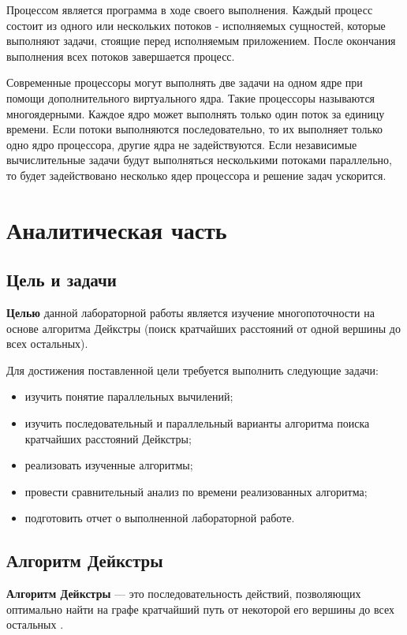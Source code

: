 \documentclass[a4paper,14pt, unknownkeysallowed]{extreport}
\begin{document}
Процессом является программа в ходе своего выполнения. 
Каждый процесс состоит из одного или нескольких потоков - исполняемых сущностей, которые выполняют задачи, стоящие перед исполняемым приложением. 
После окончания выполнения всех потоков завершается процесс.

Современные процессоры могут выполнять две задачи на одном ядре при помощи дополнительного виртуального ядра. 
Такие процессоры называются многоядерными. 
Каждое ядро может выполнять только один поток за единицу времени. 
Если потоки выполняются последовательно, то их выполняет только одно ядро процессора, другие ядра не задействуются. 
Если независимые вычислительные задачи будут выполняться несколькими потоками параллельно, то будет задействовано несколько ядер процессора и решение задач ускорится.

	
\chapter{Аналитическая часть}
	
\section{Цель и задачи}
\textbf{Целью} данной лабораторной работы является изучение многопоточности на основе алгоритма Дейкстры (поиск кратчайших расстояний от одной вершины до всех остальных). 

Для достижения поставленной цели требуется выполнить следующие задачи:

\begin{itemize}
	\item изучить понятие параллельных вычилений;
	\item изучить последовательный и параллельный варианты алгоритма поиска кратчайших расстояний Дейкстры;
	\item реализовать изученные алгоритмы;
	\item провести сравнительный анализ по времени реализованных алгоритма;
	\item подготовить отчет о выполненной лабораторной работе.
\end{itemize}
	
	
\section{Алгоритм Дейкстры}

\textbf{Алгоритм Дейкстры} --- это последовательность действий, позволяющих оптимально найти на графе кратчайший путь от некоторой его вершины до всех остальных \cite{lebedev}.
\end{document}

